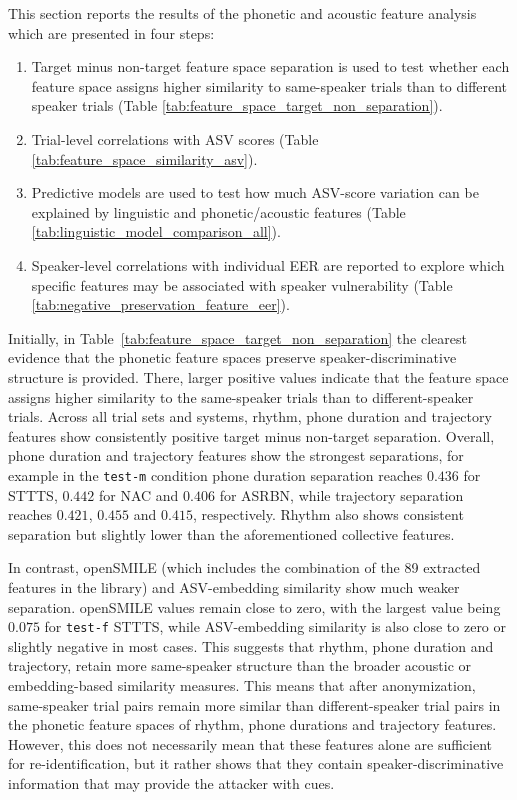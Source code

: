 \documentclass[12pt,leqno,a4paper]{article}
\begin{document}
This section reports the results of the phonetic and acoustic feature analysis which are presented in four steps:

\begin{enumerate}
    \item Target minus non-target feature space separation is used to test whether each feature space assigns higher similarity to same-speaker trials than to different speaker trials (Table \ref{tab:feature_space_target_non_separation}).
    \item Trial-level correlations with ASV scores (Table \ref{tab:feature_space_similarity_asv}).
    \item Predictive models are used to test how much ASV-score variation can be explained by linguistic and phonetic/acoustic features (Table \ref{tab:linguistic_model_comparison_all}).
    \item Speaker-level correlations with individual EER are reported to explore which specific features may be associated with speaker vulnerability (Table \ref{tab:negative_preservation_feature_eer}).
\end{enumerate}

Initially, in Table~\ref{tab:feature_space_target_non_separation} the clearest evidence that the phonetic feature spaces preserve speaker-discriminative structure is provided. There, larger positive values indicate that the feature space assigns higher similarity to the same-speaker trials than to different-speaker trials. Across all trial sets and systems, rhythm, phone duration and trajectory features show consistently positive target minus non-target separation. Overall, phone duration and trajectory features show the strongest separations, for example in the \texttt{test-m} condition phone duration separation reaches $0.436$ for STTTS, $0.442$ for NAC and $0.406$ for ASRBN, while trajectory separation reaches $0.421$, $0.455$ and $0.415$, respectively. Rhythm also shows consistent separation but slightly lower than the aforementioned collective features. 

In contrast, openSMILE (which includes the combination of the 89 extracted features in the library) and ASV-embedding similarity show much weaker separation. openSMILE values remain close to zero, with the largest value being $0.075$ for \texttt{test-f} STTTS, while ASV-embedding similarity is also close to zero or slightly negative in most cases.
This suggests that rhythm, phone duration and trajectory, retain more same-speaker structure than the broader acoustic or embedding-based similarity measures. This means that after anonymization, same-speaker trial pairs remain more similar than different-speaker trial pairs in the phonetic feature spaces of rhythm, phone durations and trajectory features. However, this does not necessarily mean that these features alone are sufficient for re-identification, but it rather shows that they contain speaker-discriminative information that may provide the attacker with cues.
\end{document}
